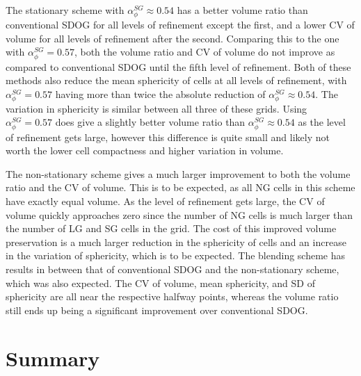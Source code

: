 The stationary scheme with $\alpha_{\phi}^{SG} \approx 0.54$ has a better volume ratio than conventional SDOG for all levels of refinement except the first, and a lower CV of volume for all levels of refinement after the second.
Comparing this to the one with $\alpha_{\phi}^{SG} = 0.57$, both the volume ratio and CV of volume do not improve as compared to conventional SDOG until the fifth level of refinement.
Both of these methods also reduce the mean sphericity of cells at all levels of refinement, with $\alpha_{\phi}^{SG} = 0.57$ having more than twice the absolute reduction of $\alpha_{\phi}^{SG} \approx 0.54$.
The variation in sphericity is similar between all three of these grids.
Using $\alpha_{\phi}^{SG} = 0.57$ does give a slightly better volume ratio than $\alpha_{\phi}^{SG} \approx 0.54$ as the level of refinement gets large, however this difference is quite small and likely not worth the lower cell compactness and higher variation in volume.


The non-stationary scheme gives a much larger improvement to both the volume ratio and the CV of volume.
This is to be expected, as all NG cells in this scheme have exactly equal volume.
As the level of refinement gets large, the CV of volume quickly approaches zero since the number of NG cells is much larger than the number of LG and SG cells in the grid.
The cost of this improved volume preservation is a much larger reduction in the sphericity of cells and an increase in the variation of sphericity, which is to be expected.
The blending scheme has results in between that of conventional SDOG and the non-stationary scheme, which was also expected.
The CV of volume, mean sphericity, and SD of sphericity are all near the respective halfway points, whereas the volume ratio still ends up being a significant improvement over conventional SDOG.

\section{Summary}